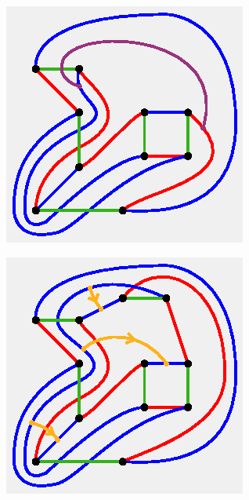 \documentclass[11pt, oneside]{amsart}
\theoremstyle{theorem}
\theoremstyle{definition}
\theoremstyle{theorem}
\begin{document}
\begin{figure}[h!]
\begin{subfigure}{.25\textwidth}
  \centering
  \includegraphics[width=.9\linewidth]{nonbt9.eps}
  \label{nxb9}
\end{subfigure}%
\begin{subfigure}{.25\textwidth}
  \centering
  \includegraphics[width=.9\linewidth]{nonbt10.eps}
  \label{nxb10}
\end{subfigure}

\end{figure}
\end{document}
